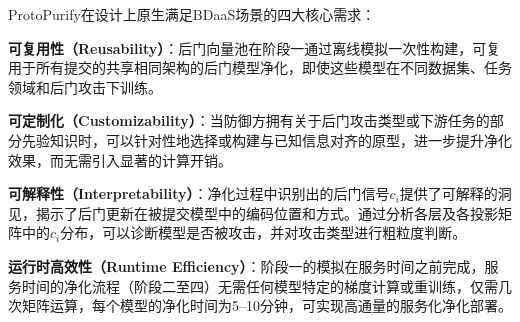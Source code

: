 ProtoPurify在设计上原生满足BDaaS场景的四大核心需求：

\textbf{可复用性（Reusability）}：后门向量池在阶段一通过离线模拟一次性构建，可复用于所有提交的共享相同架构的后门模型净化，即使这些模型在不同数据集、任务领域和后门攻击下训练。

\textbf{可定制化（Customizability）}：当防御方拥有关于后门攻击类型或下游任务的部分先验知识时，可以针对性地选择或构建与已知信息对齐的原型，进一步提升净化效果，而无需引入显著的计算开销。

\textbf{可解释性（Interpretability）}：净化过程中识别出的后门信号$c_i$提供了可解释的洞见，揭示了后门更新在被提交模型中的编码位置和方式。通过分析各层及各投影矩阵中的$c_i$分布，可以诊断模型是否被攻击，并对攻击类型进行粗粒度判断。

\textbf{运行时高效性（Runtime Efficiency）}：阶段一的模拟在服务时间之前完成，服务时间的净化流程（阶段二至四）无需任何模型特定的梯度计算或重训练，仅需几次矩阵运算，每个模型的净化时间为5--10分钟，可实现高通量的服务化净化部署。
